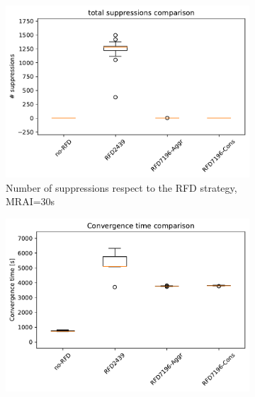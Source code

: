 \begin{figure}[H]
\begin{subfigure}[b]{0.325\textwidth}
         \label{fig:1000_RFD_MRAI30_messages_elephant}
     \end{subfigure}
     \hfill
     \begin{subfigure}[b]{0.325\textwidth}
         \centering
         \includegraphics[width=\textwidth]{images/RFD/miceVSelephants/MultiMRAI/30/elephants/cisco_1000MRAI30_rfd_comparison_suppressions_boxplot.pdf}
         \caption{Number of suppressions respect to the RFD strategy, MRAI=30s}
         \label{fig:1000_RFD_MRAI30_suppressions_elephant}
     \end{subfigure}
     \vfill
     \begin{subfigure}[b]{0.325\textwidth}
         \centering
         \includegraphics[width=\textwidth]{images/RFD/miceVSelephants/MultiMRAI/45/elephants/cisco_1000MRAI45_rfd_comparison_time_boxplot.pdf}

\end{subfigure}
\end{figure}

